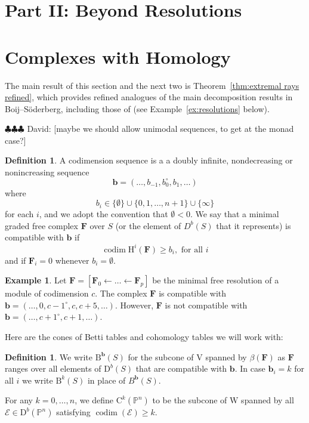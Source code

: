 \documentclass[12pt]{amsart}
\theoremstyle{definition}
\newtheorem{example}[lemma]{Example}
\newtheorem{defn}[lemma]{Definition}
\theoremstyle{remark}
\newcommand{\codim}{\operatorname{codim}}
\newcommand{\PP}{\mathbb{P}}
\newcommand{\HH}{\mathrm{H}}
\newcommand{\VV}{\mathrm{V}}
\newcommand{\WW}{\mathrm{W}}
\newcommand{\bb}{\mathbf{b}}
\newcommand{\cE}{\mathcal{E}}
\newcommand{\FF}{\mathbf{F}}
\newcommand{\defi}[1]{\textsf{#1}} %
\newcommand{\DD}{\mathrm{D}}
\newcommand{\CQ}{\mathrm{C}}
\newcommand{\BBQ}{\mathrm{B}}
\newcommand{\david}[1]{{\color{red} \sf $\clubsuit\clubsuit\clubsuit$ David: [#1]}}
\begin{document}
\section*{Part II: Beyond Resolutions}
\section{Complexes with Homology}\label{sec:refined}
The main result of this section and the next two is Theorem~\ref{thm:extremal rays refined}, which provides refined analogues of the main decomposition results in Boij--S\"oderberg, including those of \cites{eis-schrey1,boij-sod2} (see Example~\ref{ex:resolutions} below).  

\david{maybe we should allow unimodal sequences, to get at the monad case?}
\begin{defn} A \defi{codimension sequence} is a
a doubly infinite, nondecreasing or nonincreasing sequence 
$$
\bb=(\dots, b_{-1}, b_{0}^{\circ}, b_{1}, \dots )
$$
where  
$$
b_{i}\in \{\emptyset\} \cup \{0,1,\dots,n+1\}\cup \{\infty\}
$$
for each $i$, and we adopt the convention that $\emptyset<0$.   We say that a
minimal graded free complex $\FF$ over $S$ (or the element of $D^{b}(S)$ that it represents) is \defi{compatible with $\bb$} if 
\[
\codim \HH^i(\FF) \geq b_i, \text{ for all } i
\]
and if $\FF_i=0$ whenever $b_i=\emptyset$.
\end{defn}

\begin{example}
Let $\FF=[\FF_0\gets \dots \gets \FF_p]$ be the minimal free resolution of a module of codimension $c$.  The complex $\FF$ is compatible with $\bb=(\dots, 0,c-1^\circ,c,c+5,\dots)$.  However, $\FF$ is not compatible with $\bb=(\dots,c+1^\circ,c+1,\dots)$.  
\end{example}

Here are the cones of Betti tables and cohomology tables we will work with:
\begin{defn}\label{defn:cones}
We write $\BBQ^{\bb}(S)$ for the subcone of $\VV$ spanned by $\beta(\FF)$ as $\FF$ ranges over all elements of $\DD^b(S)$ that are compatible with $\bb$.  In case  $\bb_i=k$ for all $i$ we write $\BBQ^k(S)$ in place of $B^{\bb}(S)$.

For any $k=0, \dots, n$, we define $\CQ^k(\PP^n)$ to be the subcone of $\WW$ spanned by all $\cE\in \DD^b(\PP^n)$ satisfying $\codim(\cE)\geq k$.
\end{defn}
\end{document}
